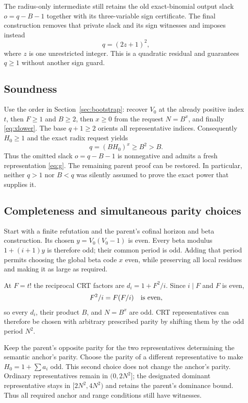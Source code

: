 \documentclass[11pt]{article}
\theoremstyle{remark}
\numberwithin{equation}{section}
\begin{document}
The radius-only intermediate still retains the old exact-binomial output slack $o=q-B-1$ together with its three-variable sign certificate. The final construction removes that private slack and its sign witnesses and imposes instead
\begin{equation}\label{eq:oddq}
q=(2z+1)^2,
\end{equation}
where $z$ is one unrestricted integer. This is a quadratic residual and guarantees $q\ge1$ without another sign guard.

\subsection{Soundness}

Use the order in Section~\ref{sec:bootstrap}: recover $V_0$ at the already positive index $t$, then $F\ge1$ and $B\ge2$, then $x\ge0$ from the request $N=B^x$, and finally \eqref{eq:xlower}. The base $q+1\ge2$ orients all representative indices. Consequently $H_0\ge1$ and the exact radix request yields
\[
q=(BH_0)^x\ge B^2>B.
\]
Thus the omitted slack $o=q-B-1$ is nonnegative and admits a fresh representation \eqref{eq:g}. The remaining parent proof can be restored. In particular, neither $q>1$ nor $B<q$ was silently assumed to prove the exact power that supplies it.

\subsection{Completeness and simultaneous parity choices}

Start with a finite refutation and the parent's cofinal horizon and beta construction. Its chosen $y=V_0(V_0-1)$ is even. Every beta modulus $1+(i+1)y$ is therefore odd; their common period is odd. Adding that period permits choosing the global beta code $x$ even, while preserving all local residues and making it as large as required.

At $F=t!$ the reciprocal CRT factors are $d_i=1+F^2/i$. Since $i\mid F$ and $F$ is even,
\[
F^2/i=F(F/i)\quad\hbox{is even},
\]
so every $d_i$, their product $B$, and $N=B^x$ are odd. CRT representatives can therefore be chosen with arbitrary prescribed parity by shifting them by the odd period $N^2$.

Keep the parent's opposite parity for the two representatives determining the semantic anchor's parity. Choose the parity of a different representative to make $H_0=1+\sum a_i$ odd. This second choice does not change the anchor's parity. Ordinary representatives remain in $(0,2N^2]$; the designated dominant representative stays in $[2N^2,4N^2)$ and retains the parent's dominance bound. Thus all required anchor and range conditions still have witnesses.
\end{document}
